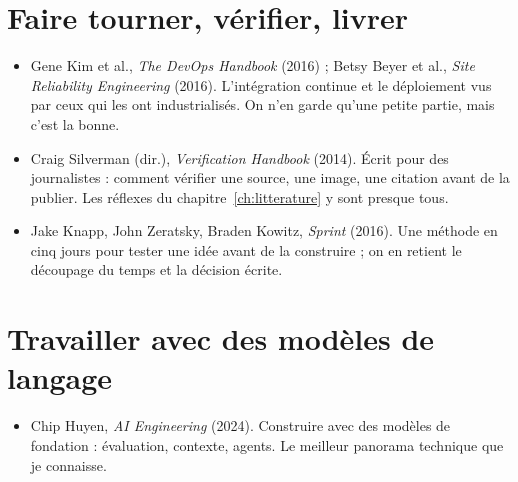 \section*{Faire tourner, vérifier, livrer}
\begin{itemize}
  \item Gene Kim et al., \emph{The DevOps Handbook} (2016) ; Betsy Beyer et al.,
        \emph{Site Reliability Engineering} (2016). L'intégration continue et le déploiement
        vus par ceux qui les ont industrialisés. On n'en garde qu'une petite partie, mais
        c'est la bonne.
  \item Craig Silverman (dir.), \emph{Verification Handbook} (2014). Écrit pour des
        journalistes : comment vérifier une source, une image, une citation avant de la
        publier. Les réflexes du chapitre~\ref{ch:litterature} y sont presque tous.
  \item Jake Knapp, John Zeratsky, Braden Kowitz, \emph{Sprint} (2016). Une méthode en cinq jours pour tester une idée
        avant de la construire ; on en retient le découpage du temps et la décision écrite.
\end{itemize}

\section*{Travailler avec des modèles de langage}
\begin{itemize}
  \item Chip Huyen, \emph{AI Engineering} (2024). Construire avec des modèles de fondation :
        évaluation, contexte, agents. Le meilleur panorama technique que je connaisse.
\end{itemize}

